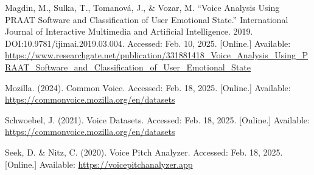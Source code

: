 \documentclass{article}
\begin{document}
\begin{thebibliography}{citations}
Magdin, M., Sulka, T., Tomanová, J., \& Vozar, M. “Voice Analysis Using PRAAT Software and Classification of User Emotional State.” International Journal of Interactive Multimedia and Artificial Intelligence. 2019. DOI:10.9781/ijimai.2019.03.004. Accessed: Feb. 10, 2025. [Online.] Available: \url{https://www.researchgate.net/publication/331881418_Voice_Analysis_Using_PRAAT_Software_and_Classification_of_User_Emotional_State}

Mozilla. (2024). Common Voice. Accessed: Feb. 18, 2025. [Online.] Available: \url{https://commonvoice.mozilla.org/en/datasets}

Schwoebel, J. (2021). Voice Datasets. Accessed: Feb. 18, 2025. [Online.] Available: \url{https://commonvoice.mozilla.org/en/datasets}

Seek, D. \& Nitz, C. (2020). Voice Pitch Analyzer. Accessed: Feb. 18, 2025. [Online.] Available: \url{https://voicepitchanalyzer.app}


\end{thebibliography}
%
%
%
%
\end{document}
